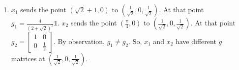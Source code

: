 \documentclass[12pt]{article}
\begin{document}
\begin{enumerate}[label=\Alph*., leftmargin=*]
\begin{enumerate}
        $x_1$ sends the point $(1,0)$ to $(1,0,0)$, and at that point $g_1=\frac{4}{{(1+1)}^2}\mathds{1}=\mathds{1}$. $x_2$ sends the point $(\frac{\pi}{2}, 0)$ to $(1,0,0)$, and $g_2=\begin{bmatrix}
            1&0\\
            0&\sin^2(\frac{\pi}{2})
        \end{bmatrix}=\mathds{1}$. So, they do have the same $g$ matrix at $(1,0,0)$.
        \item $x_1$ sends the point $(\sqrt{2}+1,0)$ to $(\frac{1}{\sqrt{2}},0,\frac{1}{\sqrt{2}})$. At that point $g_1=\frac{4}{{(2+\sqrt{2})}^2}\mathds{1}$. $x_2$ sends the point $(\frac{\pi}{4},0)$ to
        $(\frac{1}{\sqrt{2}},0,\frac{1}{\sqrt{2}})$. At that point $g_2=\begin{bmatrix}
            1&0\\
            0&\frac{1}{2}
        \end{bmatrix}$. By observation, $g_1\neq g_2$. So, $x_1$ and $x_2$ have different $g$ matrices at $(\frac{1}{\sqrt{2}},0,\frac{1}{\sqrt{2}})$.
    \end{enumerate}
\end{enumerate}
\end{document}

